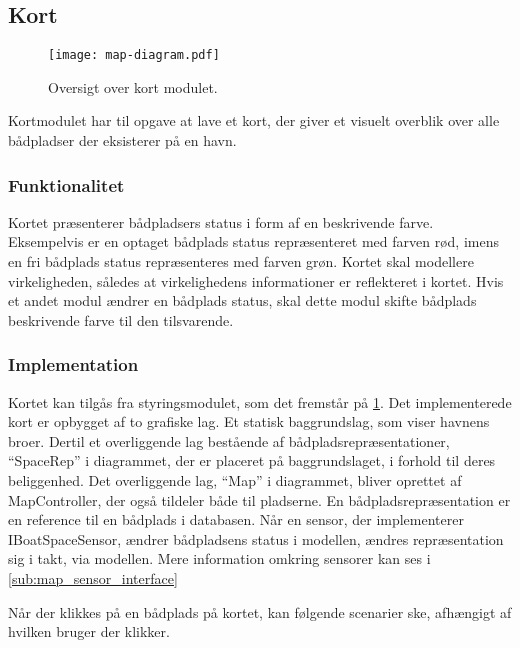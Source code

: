 \subsection{Kort}
\label{sub:kort}

\begin{figure}
  \centering
  \texttt{[image: map-diagram.pdf]}
  \caption{Oversigt over kort modulet.}
  \label{fig:map_diagram}
\end{figure}

Kortmodulet har til opgave at lave et kort, der giver et visuelt overblik over alle bådpladser der eksisterer på en havn.

\subsubsection{Funktionalitet}
\label{ssub:kort_funktionalitet}

Kortet præsenterer bådpladsers status i form af en beskrivende farve. Eksempelvis er en optaget bådplads status repræsenteret med farven rød, imens en fri bådplads status repræsenteres med farven grøn. Kortet skal modellere virkeligheden, således at virkelighedens informationer er reflekteret i kortet. Hvis et andet modul ændrer en bådplads status, skal dette modul skifte bådplads beskrivende farve til den tilsvarende.

\subsubsection{Implementation}
\label{ssub:kort_implementation}

Kortet kan tilgås fra styringsmodulet, som det fremstår på \cref{fig:map_diagram}. Det implementerede kort er opbygget af to grafiske lag. Et statisk baggrundslag, som viser havnens broer. Dertil et overliggende lag bestående af bådpladsrepræsentationer, \enquote{SpaceRep} i diagrammet, der er placeret på baggrundslaget, i forhold til deres beliggenhed. Det overliggende lag, \enquote{Map} i diagrammet, bliver oprettet af MapController, der også tildeler både til pladserne. En bådpladsrepræsentation er en reference til en bådplads i databasen. Når en sensor, der implementerer IBoatSpaceSensor, ændrer bådpladsens status i modellen, ændres repræsentation sig i takt, via modellen. Mere information omkring sensorer kan ses i \cref{sub:map_sensor_interface}

Når der klikkes på en bådplads på kortet, kan følgende scenarier ske, afhængigt af hvilken bruger der klikker.


